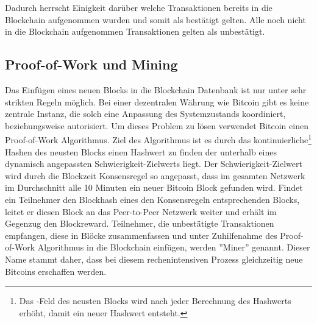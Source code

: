 \if Dadurch herrscht Einigkeit darüber welche Transaktionen bereits in die Blockchain aufgenommen wurden und somit als bestätigt gelten. Alle noch nicht in die Blockchain aufgenommen Transaktionen gelten als unbestätigt. \fi

\subsection{Proof-of-Work und Mining}
Das Einfügen eines neuen Blocks in die Blockchain Datenbank ist nur unter sehr strikten Regeln möglich. Bei einer dezentralen Währung wie Bitcoin gibt es keine zentrale Instanz, die solch eine Anpassung des Systemzustands koordiniert, beziehungsweise autorisiert. Um dieses Problem zu lösen verwendet Bitcoin einen Proof-of-Work Algorithmus. Ziel des Algorithmus ist es durch das kontinuierliche\footnote{Das -Feld des neusten Blocks wird nach jeder Berechnung des Hashwerts erhöht, damit ein neuer Hashwert entsteht.} Hashen des neusten Blocks einen Hashwert zu finden der unterhalb eines dynamisch angepassten Schwierigkeit-Zielwerts liegt. Der Schwierigkeit-Zielwert wird durch die Blockzeit Konsensregel so angepasst, dass im gesamten Netzwerk im Durchschnitt alle 10 Minuten ein neuer Bitcoin Block gefunden wird. Findet ein Teilnehmer den Blockhash eines den Konsensregeln entsprechenden Blocks, leitet er diesen Block an das Peer-to-Peer Netzwerk weiter und erhält im Gegenzug den Blockreward. Teilnehmer, die unbestätigte Transaktionen empfangen, diese in Blöcke zusammenfassen und unter Zuhilfenahme des Proof-of-Work Algorithmus in die Blockchain einfügen, werden ''Miner'' genannt. Dieser Name stammt daher, dass bei diesem rechenintensiven Prozess gleichzeitig neue Bitcoins erschaffen werden.

